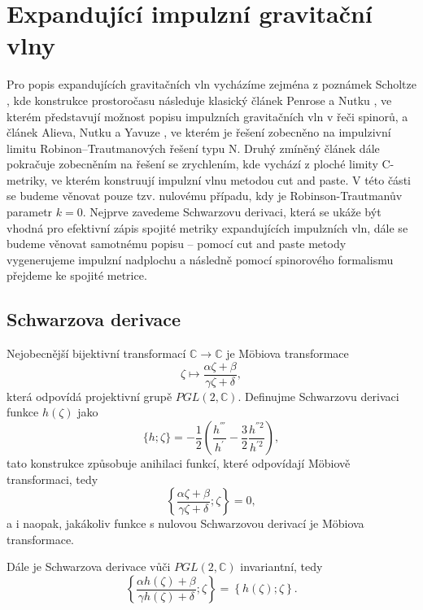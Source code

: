 \section{Expandující impulzní gravitační vlny}
Pro popis expandujících gravitačních vln vycházíme zejména z  poznámek Scholtze \cite{scholtz_notes}, kde konstrukce prostoročasu následuje klasický článek
Penrose a Nutku \cite{PenroseNutku1992}, ve kterém představují možnost popisu impulzních gravitačních vln v řeči spinorů, a článek Alieva, Nutku a Yavuze \cite{Aliev2001},
ve kterém je řešení zobecněno na impulzivní limitu Robinon--Trautmanových řešení typu N.
Druhý zmíněný článek dále pokračuje zobecněním na řešení se zrychlením, kde vychází z ploché limity C-metriky, ve kterém konstruují impulzní vlnu metodou cut and paste.
V této části se budeme věnovat pouze tzv. nulovému případu, kdy je Robinson-Trautmanův parametr $k=0$.
Nejprve zavedeme Schwarzovu derivaci, která se ukáže být vhodná pro efektivní zápis spojité metriky expandujících impulzních vln,
dále se budeme věnovat samotnému popisu -- pomocí cut and paste metody vygenerujeme impulzní nadplochu a následně pomocí spinorového
formalismu přejdeme ke spojité metrice.
\subsection{Schwarzova derivace}
Nejobecnější bijektivní transformací $\mathbb{C} \to \mathbb{C}$ je Möbiova transformace
\begin{equation}
    \zeta \mapsto \frac{\alpha \zeta + \beta}{\gamma \zeta + \delta},
\end{equation}
která odpovídá projektivní grupě $PGL(2, \mathbb{C})$. Definujme Schwarzovu derivaci funkce $h(\zeta)$ jako
\begin{equation}
    \{h; \zeta\} = -\frac{1}{2}\left(\frac{h^{'''}}{h^{'}} - \frac{3}{2} \frac{h^{''2}}{h^{'2}}\right),
\end{equation}
tato konstrukce způsobuje anihilaci funkcí, které odpovídají Möbiově transformaci, tedy
\begin{equation}
    \left\{ \frac{\alpha \zeta + \beta}{\gamma \zeta + \delta}; \zeta \right\} = 0,
\end{equation}
a i naopak, jakákoliv funkce s nulovou Schwarzovou derivací je Möbiova transformace.

Dále je Schwarzova derivace vůči $PGL(2, \mathbb{C})$ invariantní, tedy
\begin{equation}
    \left\{ \frac{\alpha h(\zeta) + \beta}{\gamma h(\zeta) + \delta} ; \zeta \right\} = \left\{ h(\zeta); \zeta \right\}.
\end{equation}

